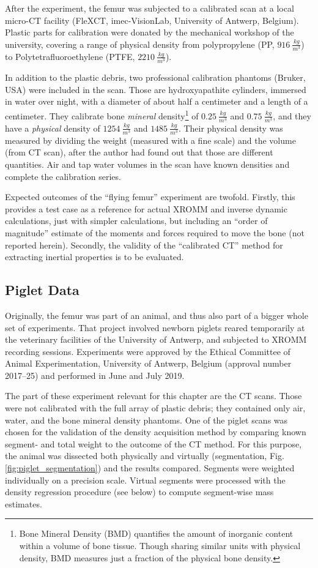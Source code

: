 After the experiment, the femur was subjected to a calibrated scan at a local micro-CT facility (FleXCT, imec-VisionLab, University of Antwerp, Belgium).
Plastic parts for calibration were donated by the mechanical workshop of the university, covering a range of physical density from polypropylene (PP, \(916\ \frac{kg}{m^3}\)) to Polytetrafluoroethylene (PTFE, \(2210\ \frac{kg}{m^3}\)).

In addition to the plastic debris, two professional calibration phantoms (Bruker, USA) were included in the scan.
Those are hydroxyapathite cylinders, immersed in water over night, with a diameter of about half a centimeter and a length of a centimeter.
They calibrate bone \emph{mineral} density\footnote{Bone Mineral Density (BMD) quantifies the amount of inorganic content within a volume of bone tissue. Though sharing similar units with physical density, BMD measures just a fraction of the physical bone density.} of \(0.25\ \frac{kg}{m^3}\) and \(0.75\ \frac{kg}{m^3}\), and they have a \emph{physical} density of \(1254\ \frac{kg}{m^3}\) and \(1485\ \frac{kg}{m^3}\).
Their physical density was measured by dividing the weight (measured with a fine scale) and the volume (from CT scan), after the author had found out that those are different quantities.
Air and tap water volumes in the scan have known densities and complete the calibration series.


Expected outcomes of the ``flying femur'' experiment are twofold.
Firstly, this provides a test case as a reference for actual XROMM and inverse dynamic calculations, just with simpler calculations, but including an ``order of magnitude'' estimate of the moments and forces required to move the bone (not reported herein).
Secondly, the validity of the ``calibrated CT'' method for extracting inertial properties is to be evaluated.


\subsection{Piglet Data}
\label{sec:org1abb4a1}
Originally, the femur was part of an animal, and thus also part of a bigger whole set of experiments.
That project involved newborn piglets reared temporarily at the veterinary facilities of the University of Antwerp, and subjected to XROMM recording sessions.
Experiments were approved by the Ethical Committee of Animal Experimentation, University of Antwerp, Belgium (approval number 2017–25) and performed in June and July 2019.

The part of these experiment relevant for this chapter are the CT scans.
Those were not calibrated with the full array of plastic debris; they contained only air, water, and the bone mineral density phantoms.
One of the piglet scans was chosen for the validation of the density acquisition method by comparing known segment- and total weight to the outcome of the CT method.
For this purpose, the animal was dissected both physically and virtually (segmentation, Fig. \ref{fig:piglet_segmentation}) and the results compared.
Segments were weighted individually on a precision scale.
Virtual segments were processed with the density regression procedure (see below) to compute segment-wise mass estimates.

